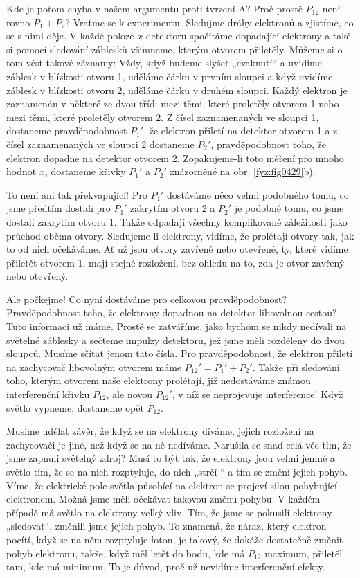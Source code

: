     Kde je potom chyba v našem argumentu proti tvrzení A? Proč prostě \(P_{12}\) není rovno
    \(P_1+P_2\)? Vraťme se k experimentu. Sledujme dráhy elektronů a zjistíme, co se s nimi děje. V
    každé poloze \(x\) detektoru spočítáme dopadající elektrony a také si pomocí sledování záblesků
    všimneme, kterým otvorem přiletěly. Můžeme si o tom vést takové záznamy: Vždy, když budeme
    slyšet „cvaknutí“ a uvidíme záblesk v blízkosti otvoru 1, uděláme čárku v prvním sloupci a když
    uvidíme záblesk v blízkosti otvoru 2, uděláme čárku v druhém sloupci. Každý elektron je
    zaznamenán v některé ze dvou tříd: mezi těmi, které proletěly otvorem 1 nebo mezi těmi, které
    proletěly otvorem 2. Z čísel zaznamenaných ve sloupci 1, dostaneme pravděpodobnost \(P_1'\), že
    elektron přiletí na detektor otvorem 1 a z čísel zaznamenaných ve sloupci 2 dostaneme \(P_2'\),
    pravděpodobnost toho, že elektron dopadne na detektor otvorem 2. Zopakujeme-li toto měření pro
    mnoho hodnot \(x\), dostaneme křivky \(P_1'\) a \(P_2'\) znázorněné na obr. \ref{fyz:fig0429}b).
    
    To není ani tak překvapující! Pro \(P_1'\) dostáváme něco velmi podobného tomu, co jsme předtím
    dostali pro \(P_1'\) zakrytím otvoru 2 a \(P_2'\) je podobné tomu, co jsme dostali zakrytím
    otvoru 1. Takže odpadají všechny komplikované záležitosti jako průchod oběma otvory.
    Sledujeme-li elektrony, vidíme, že prolétají otvory tak, jak to od nich očekáváme. Ať už jsou
    otvory zavřené nebo otevřené, ty, které vidíme přiletět otvorem 1, mají stejné rozložení, bez
    ohledu na to, zda je otvor zavřený nebo otevřený.
    
    Ale počkejme! Co nyní dostáváme pro celkovou pravděpodobnost? Pravděpodobnost toho, že elektrony
    dopadnou na detektor libovolnou cestou? Tuto informaci už máme. Prostě se zatváříme, jako bychom
    se nikdy nedívali na světelné záblesky a sečteme impulzy detektoru, jež jsme měli rozděleny do
    dvou sloupců. Musíme sčítat jenom tato čísla. Pro pravděpodobnost, že elektron přiletí na
    zachycovač libovolným otvorem máme \(P_{12}' = P_1' + P_2'\). Takže při sledování toho, kterým
    otvorem naše elektrony prolétají, již nedostáváme známou interferenční křivku \(P_{12}\), ale
    novou \(P_{12}'\), v níž se neprojevuje interference! Když světlo vypneme, dostaneme opět
    \(P_{12}\).

    Musíme udělat závěr, že když se na elektrony díváme, jejich rozložení na zachycovači je jiné,
    než když se na ně nedíváme. Narušila se snad celá věc tím, že jsme zapnuli světelný zdroj? Musí
    to být tak, že elektrony jsou velmi jemné a světlo tím, že se na nich rozptyluje, do nich „strčí
    “ a tím se změní jejich pohyb. Víme, že elektrické pole světla působící na elektron se projeví
    silou pohybující elektronem. Možná jsme měli očekávat takovou změnu pohybu. V každém případě má
    světlo na elektrony velký vliv. Tím, že jsme se pokusili elektrony „sledovat“, změnili jsme
    jejich pohyb. To znamená, že náraz, který elektron pocítí, když se na něm rozptyluje foton, je
    takový, že dokáže dostatečně změnit pohyb elektronu, takže, když měl letět do bodu, kde má
    \(P_{12}\) maximum, přiletěl tam, kde má minimum. To je důvod, proč už nevidíme interferenční
    efekty.
    
